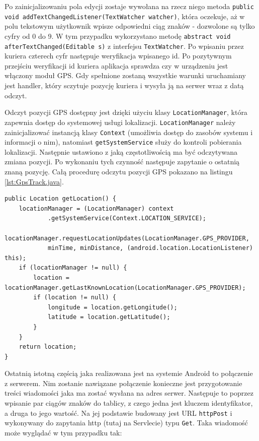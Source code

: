 \documentclass[eng,printmode,oneside]{mgr}
\begin{document}
Po zainicjalizowaniu pola edycji zostaje wywołana na rzecz niego metoda
\texttt{public void addTextChangedListener(TextWatcher watcher)}, która
oczekuje, aż w polu tekstowym użytkownik wpisze odpowiedni ciąg znaków -
dozwolone są tylko cyfry od 0 do 9.
W tym przypadku wykorzystano metodę \texttt{abstract void
afterTextChanged(Editable s)} z interfejsu \texttt{TextWatcher}. Po wpisaniu
przez kuriera czterech cyfr następuje weryfikacja wpisanego id. Po pozytywnym
przejściu weryfikacji id kuriera aplikacja sprawdza czy w urządzeniu jest
włączony moduł GPS. Gdy spełnione zostaną wszystkie warunki uruchamiany jest
handler, który sczytuje pozycję kuriera i wysyła ją na serwer wraz z datą odczyt. 

Odczyt pozycji GPS dostępny jest dzięki użyciu klasy \texttt{LocationManager},
która zapewnia dostęp do systemowej usługi lokalizacji. \texttt{LocationManager}
należy zainicjalizować instancją klasy \texttt{Context} (umożliwia dostęp do
zasobów systemu i informacji o nim), natomiast \texttt{getSystemService} służy
do kontroli pobierania lokalizacji. Następnie ustawiono z jaką częstotliwością
ma być odczytywana zmiana pozycji. Po wykonaniu tych czynność następuje
zapytanie o ostatnią znaną pozycję. Całą procedurę odczytu pozycji GPS pokazano
na listingu \ref{lst:GpsTrack.java}.

 \begin{lstlisting}[caption=Pobieranie lokalizacji
kuriera metoda getLocation() z klasy GpsTrack,label=lst:GpsTrack.java]
public Location getLocation() {
	locationManager = (LocationManager) context
			.getSystemService(Context.LOCATION_SERVICE);
	locationManager.requestLocationUpdates(LocationManager.GPS_PROVIDER,
			minTime, minDistance, (android.location.LocationListener) this);
	if (locationManager != null) {
		location = locationManager.getLastKnownLocation(LocationManager.GPS_PROVIDER);
		if (location != null) {
			longitude = location.getLongitude();
			latitude = location.getLatitude();
		}
	}
	return location;
}
\end{lstlisting}

Ostatnią istotną częścią jaka realizowana jest na systemie Android to połączenie
z serwerem. Nim zostanie nawiązane połączenie konieczne jest przygotowanie
treści wiadomości jaka ma zostać wysłana na adres serwer. Następuje to poprzez
wpisanie par ciągów znaków do tablicy, z czego jedna jest kluczem identyfikator,
a druga to jego wartość. Na jej podstawie budowany jest URL \texttt{httpPost}
i wykonywany do zapytania http (tutaj na Servlecie) typu \texttt{Get}. Taka
wiadomość może wyglądać w tym przypadku tak:
\end{document}
